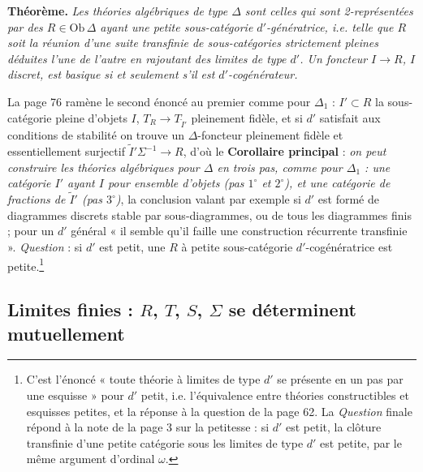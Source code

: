 \documentclass[11pt,a4paper]{article}
\begin{document}
\textbf{Théorème.} \emph{Les théories algébriques de type $\Delta$ sont
celles qui sont 2-représentées par des $R \in \mathrm{Ob}\,\Delta$ ayant une
petite sous-catégorie $d'$-génératrice, i.e. telle que $R$ soit la réunion
d'une suite transfinie de sous-catégories strictement pleines déduites
l'une de l'autre en rajoutant des limites de type $d'$. Un foncteur $I \to
R$, $I$ discret, est basique si et seulement s'il est $d'$-cogénérateur.}

La page 76 ramène le second énoncé au premier comme pour $\Delta_{1}$ :
$I' \subset R$ la sous-catégorie pleine d'objets $I$, $T_{R} \to
T_{\widetilde{I}'}$ pleinement fidèle, et si $d'$ satisfait aux conditions
de stabilité on trouve un $\Delta$-foncteur pleinement fidèle et
essentiellement surjectif $\widetilde{I}'\Sigma^{-1} \to R$, d'où le
\textbf{Corollaire principal} : \emph{on peut construire les théories
algébriques pour $\Delta$ en trois pas, comme pour $\Delta_{1}$ : une
catégorie $I'$ ayant $I$ pour ensemble d'objets (pas $1^{\circ}$ et
$2^{\circ}$), et une catégorie de fractions de $\widetilde{I}'$ (pas
$3^{\circ}$)}, la conclusion valant par exemple si $d'$ est formé de
diagrammes discrets stable par sous-diagrammes, ou de tous les diagrammes
finis ; pour un $d'$ général « il semble qu'il faille une construction
récurrente transfinie ». \emph{Question} : si $d'$ est petit, une $R$ à
petite sous-catégorie $d'$-cogénératrice est petite.\footnote{C'est
l'énoncé « toute théorie à limites de type $d'$ se présente en un pas par
une esquisse » pour $d'$ petit, i.e. l'équivalence entre théories
constructibles et esquisses petites, et la réponse à la question de la
page 62. La \emph{Question} finale répond à la note de la page 3 sur la
petitesse : si $d'$ est petit, la clôture transfinie d'une petite
catégorie sous les limites de type $d'$ est petite, par le même argument
d'ordinal $\omega$.}

\subsection*{Limites finies : $R$, $T$, $S$, $\Sigma$ se déterminent mutuellement}
\end{document}
